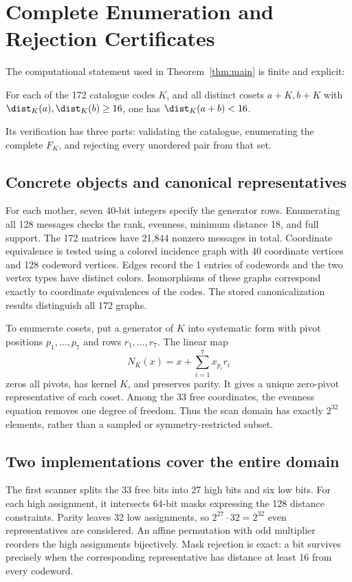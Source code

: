 \section{Complete Enumeration and Rejection Certificates}
\label{sec:computation}
The computational statement used in Theorem~\ref{thm:main} is finite and explicit:
\begin{proposition}\label{prop:computed}
For each of the 172 catalogue codes $K$, and all distinct cosets $a+K,b+K$ with $\dist_K(a),\dist_K(b)\ge16$, one has $\dist_K(a+b)<16$.
\end{proposition}
Its verification has three parts: validating the catalogue, enumerating the complete $F_K$, and rejecting every unordered pair from that set.

\subsection{Concrete objects and canonical representatives}
For each mother, seven 40-bit integers specify the generator rows. Enumerating all 128 messages checks the rank, evenness, minimum distance 18, and full support. The 172 matrices have 21,844 nonzero messages in total. Coordinate equivalence is tested using a colored incidence graph with 40 coordinate vertices and 128 codeword vertices. Edges record the 1 entries of codewords and the two vertex types have distinct colors. Isomorphisms of these graphs correspond exactly to coordinate equivalences of the codes. The stored canonicalization results distinguish all 172 graphs.

To enumerate cosets, put a generator of $K$ into systematic form with pivot positions $p_1,\ldots,p_7$ and rows $r_1,\ldots,r_7$. The linear map
\begin{equation}\label{eq:normalizer}
 N_K(x)=x+\sum_{i=1}^7 x_{p_i}r_i
\end{equation}
zeros all pivots, has kernel $K$, and preserves parity. It gives a unique zero-pivot representative of each coset. Among the 33 free coordinates, the evenness equation removes one degree of freedom. Thus the scan domain has exactly $2^{32}$ elements, rather than a sampled or symmetry-restricted subset.

\subsection{Two implementations cover the entire domain}
The first scanner splits the 33 free bits into 27 high bits and six low bits. For each high assignment, it intersects 64-bit masks expressing the 128 distance constraints. Parity leaves 32 low assignments, so $2^{27}\cdot32=2^{32}$ even representatives are considered. An affine permutation with odd multiplier reorders the high assignments bijectively. Mask rejection is exact: a bit survives precisely when the corresponding representative has distance at least 16 from every codeword.

